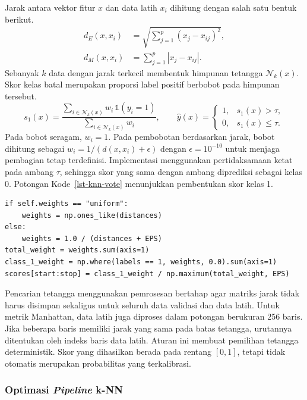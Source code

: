 Jarak antara vektor fitur $x$ dan data latih $x_i$ dihitung dengan salah satu bentuk berikut.
\begin{align}
    d_E(x,x_i) & = \sqrt{\sum_{j=1}^{p}(x_j-x_{ij})^2}, \\
    d_M(x,x_i) & = \sum_{j=1}^{p}|x_j-x_{ij}|.
    \label{eq:knn-distance}
\end{align}
Sebanyak $k$ data dengan jarak terkecil membentuk himpunan tetangga $\mathcal{N}_k(x)$. Skor kelas batal merupakan proporsi label positif berbobot pada himpunan tersebut.
\begin{equation}
    s_1(x)=
    \frac{\sum_{i\in\mathcal{N}_k(x)} w_i\,\mathbb{1}(y_i=1)}
    {\sum_{i\in\mathcal{N}_k(x)} w_i},
    \qquad
    \widehat{y}(x)=
    \begin{cases}
        1, & s_1(x)>\tau,    \\
        0, & s_1(x)\leq\tau.
    \end{cases}
    \label{eq:knn-vote}
\end{equation}
Pada bobot seragam, $w_i=1$. Pada pembobotan berdasarkan jarak, bobot dihitung sebagai $w_i=1/(d(x,x_i)+\epsilon)$ dengan $\epsilon=10^{-10}$ untuk menjaga pembagian tetap terdefinisi. Implementasi menggunakan pertidaksamaan ketat pada ambang $\tau$, sehingga skor yang sama dengan ambang diprediksi sebagai kelas 0. Potongan Kode~\ref{lst-knn-vote} menunjukkan pembentukan skor kelas 1.

\begin{lstlisting}[caption={Skor pemungutan suara berbobot pada KNNClassifier},label={lst-knn-vote}]
if self.weights == "uniform":
    weights = np.ones_like(distances)
else:
    weights = 1.0 / (distances + EPS)
total_weight = weights.sum(axis=1)
class_1_weight = np.where(labels == 1, weights, 0.0).sum(axis=1)
scores[start:stop] = class_1_weight / np.maximum(total_weight, EPS)
\end{lstlisting}

Pencarian tetangga menggunakan pemrosesan bertahap agar matriks jarak tidak harus disimpan sekaligus untuk seluruh data validasi dan data latih. Untuk metrik Manhattan, data latih juga diproses dalam potongan berukuran 256 baris. Jika beberapa baris memiliki jarak yang sama pada batas tetangga, urutannya ditentukan oleh indeks baris data latih. Aturan ini membuat pemilihan tetangga deterministik. Skor yang dihasilkan berada pada rentang $[0,1]$, tetapi tidak otomatis merupakan probabilitas yang terkalibrasi.

\subsubsection{Optimasi \textit{Pipeline} k-NN}

